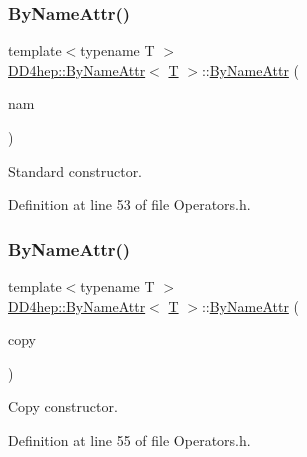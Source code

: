 \subsubsection{\texorpdfstring{By\+Name\+Attr()}{ByNameAttr()}\hspace{0.1cm}{\footnotesize\ttfamily [1/2]}}
{\footnotesize\ttfamily template$<$typename T $>$ \\
\hyperlink{class_d_d4hep_1_1_by_name_attr}{D\+D4hep\+::\+By\+Name\+Attr}$<$ \hyperlink{class_t}{T} $>$\+::\hyperlink{class_d_d4hep_1_1_by_name_attr}{By\+Name\+Attr} (\begin{DoxyParamCaption}\item[{const std\+::string \&}]{nam }\end{DoxyParamCaption})\hspace{0.3cm}{\ttfamily [inline]}}



Standard constructor. 



Definition at line 53 of file Operators.\+h.

\hypertarget{class_d_d4hep_1_1_by_name_attr_a782ea1d32c95453edfa5da378770d03a}{}\label{class_d_d4hep_1_1_by_name_attr_a782ea1d32c95453edfa5da378770d03a} 
\subsubsection{\texorpdfstring{By\+Name\+Attr()}{ByNameAttr()}\hspace{0.1cm}{\footnotesize\ttfamily [2/2]}}
{\footnotesize\ttfamily template$<$typename T $>$ \\
\hyperlink{class_d_d4hep_1_1_by_name_attr}{D\+D4hep\+::\+By\+Name\+Attr}$<$ \hyperlink{class_t}{T} $>$\+::\hyperlink{class_d_d4hep_1_1_by_name_attr}{By\+Name\+Attr} (\begin{DoxyParamCaption}\item[{const \hyperlink{class_d_d4hep_1_1_by_name_attr}{By\+Name\+Attr}$<$ \hyperlink{class_t}{T} $>$ \&}]{copy }\end{DoxyParamCaption})\hspace{0.3cm}{\ttfamily [inline]}}



Copy constructor. 



Definition at line 55 of file Operators.\+h.



